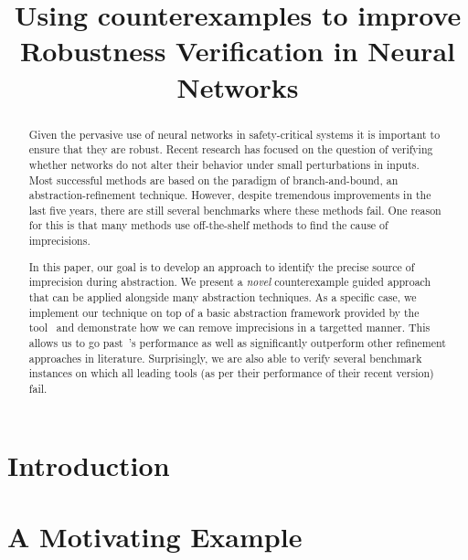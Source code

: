 \documentclass{llncs}
\title{Using counterexamples to improve Robustness Verification in Neural Networks}
\author{}
\institute{}
\begin{document}
\maketitle

\begin{abstract}
  Given the pervasive use of neural networks in safety-critical systems it is important to ensure that they are robust. Recent research has focused on the question of verifying whether networks do not alter their behavior under small perturbations in inputs. Most successful methods are based on the paradigm of branch-and-bound, an abstraction-refinement technique. However, despite tremendous improvements in the last five years, there are still several benchmarks where these methods fail. One reason for this is that many methods use off-the-shelf methods to find the cause of imprecisions.  

  In this paper, our goal is to develop an approach to identify the precise source of imprecision during abstraction. We present a {\em novel} counterexample guided approach that can be applied alongside many abstraction techniques. As a specific case, we implement our technique on top of a basic abstraction framework provided by the tool~\deeppoly{} and demonstrate how we can remove imprecisions in a targetted manner. This allows us to go past~\deeppoly{}'s performance as well as significantly outperform other refinement approaches in literature. Surprisingly, we are also able to verify several benchmark instances on which all leading tools (as per their performance of their recent version) fail. 

\end{abstract}

\section{Introduction}
\label{sec:intro}



\section{A Motivating Example}
\label{sec:motivation}

\end{document}

